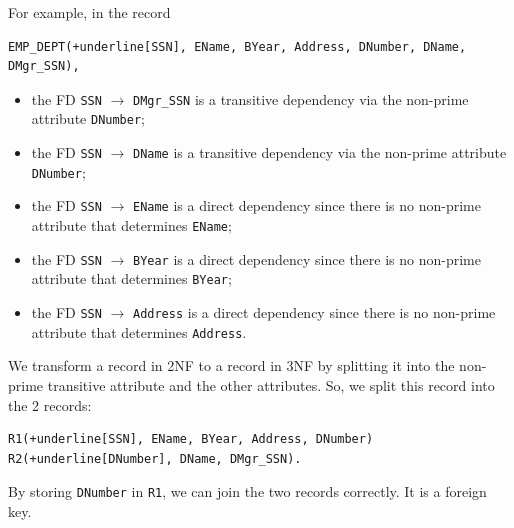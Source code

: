 \documentclass[a4paper, openany]{memoir}
\begin{document}
For example, in the record
\begin{Verbatim}[commandchars=+\[\]]
EMP_DEPT(+underline[SSN], EName, BYear, Address, DNumber, DName, DMgr_SSN),
\end{Verbatim}
\begin{itemize}
    \item the FD \texttt{SSN} $\to$ \texttt{DMgr\_SSN} is a transitive dependency via the non-prime attribute \texttt{DNumber};
    \item the FD \texttt{SSN} $\to$ \texttt{DName} is a transitive dependency via the non-prime attribute \texttt{DNumber};
    \item the FD \texttt{SSN} $\to$ \texttt{EName} is a direct dependency since there is no non-prime attribute that determines \texttt{EName};
    \item the FD \texttt{SSN} $\to$ \texttt{BYear} is a direct dependency since there is no non-prime attribute that determines \texttt{BYear};
    \item the FD \texttt{SSN} $\to$ \texttt{Address} is a direct dependency since there is no non-prime attribute that determines \texttt{Address}.
\end{itemize}
We transform a record in 2NF to a record in 3NF by splitting it into the non-prime transitive attribute and the other attributes. So, we split this record into the 2 records:
\begin{Verbatim}[commandchars=+\[\]]
R1(+underline[SSN], EName, BYear, Address, DNumber)
R2(+underline[DNumber], DName, DMgr_SSN).
\end{Verbatim}
By storing \texttt{DNumber} in \texttt{R1}, we can join the two records correctly. It is a foreign key.
\end{document}
